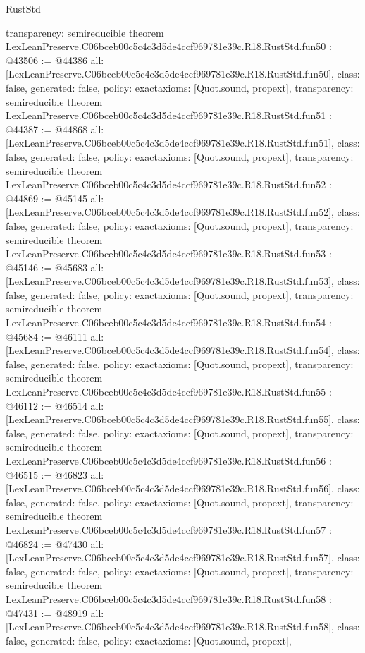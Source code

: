 \begin{lexlean}{RustStd}
\begin{coremodule}
{  transparency: semireducible
}
theorem LexLeanPreserve.C06bceb00c5c4c3d5de4ccf969781e39c.R18.RustStd.fun50 : @43506 := @44386 {
  all: [LexLeanPreserve.C06bceb00c5c4c3d5de4ccf969781e39c.R18.RustStd.fun50],
  class: false,
  generated: false,
  policy: exact{axioms: [Quot.sound, propext]},
  transparency: semireducible
}
theorem LexLeanPreserve.C06bceb00c5c4c3d5de4ccf969781e39c.R18.RustStd.fun51 : @44387 := @44868 {
  all: [LexLeanPreserve.C06bceb00c5c4c3d5de4ccf969781e39c.R18.RustStd.fun51],
  class: false,
  generated: false,
  policy: exact{axioms: [Quot.sound, propext]},
  transparency: semireducible
}
theorem LexLeanPreserve.C06bceb00c5c4c3d5de4ccf969781e39c.R18.RustStd.fun52 : @44869 := @45145 {
  all: [LexLeanPreserve.C06bceb00c5c4c3d5de4ccf969781e39c.R18.RustStd.fun52],
  class: false,
  generated: false,
  policy: exact{axioms: [Quot.sound, propext]},
  transparency: semireducible
}
theorem LexLeanPreserve.C06bceb00c5c4c3d5de4ccf969781e39c.R18.RustStd.fun53 : @45146 := @45683 {
  all: [LexLeanPreserve.C06bceb00c5c4c3d5de4ccf969781e39c.R18.RustStd.fun53],
  class: false,
  generated: false,
  policy: exact{axioms: [Quot.sound, propext]},
  transparency: semireducible
}
theorem LexLeanPreserve.C06bceb00c5c4c3d5de4ccf969781e39c.R18.RustStd.fun54 : @45684 := @46111 {
  all: [LexLeanPreserve.C06bceb00c5c4c3d5de4ccf969781e39c.R18.RustStd.fun54],
  class: false,
  generated: false,
  policy: exact{axioms: [Quot.sound, propext]},
  transparency: semireducible
}
theorem LexLeanPreserve.C06bceb00c5c4c3d5de4ccf969781e39c.R18.RustStd.fun55 : @46112 := @46514 {
  all: [LexLeanPreserve.C06bceb00c5c4c3d5de4ccf969781e39c.R18.RustStd.fun55],
  class: false,
  generated: false,
  policy: exact{axioms: [Quot.sound, propext]},
  transparency: semireducible
}
theorem LexLeanPreserve.C06bceb00c5c4c3d5de4ccf969781e39c.R18.RustStd.fun56 : @46515 := @46823 {
  all: [LexLeanPreserve.C06bceb00c5c4c3d5de4ccf969781e39c.R18.RustStd.fun56],
  class: false,
  generated: false,
  policy: exact{axioms: [Quot.sound, propext]},
  transparency: semireducible
}
theorem LexLeanPreserve.C06bceb00c5c4c3d5de4ccf969781e39c.R18.RustStd.fun57 : @46824 := @47430 {
  all: [LexLeanPreserve.C06bceb00c5c4c3d5de4ccf969781e39c.R18.RustStd.fun57],
  class: false,
  generated: false,
  policy: exact{axioms: [Quot.sound, propext]},
  transparency: semireducible
}
theorem LexLeanPreserve.C06bceb00c5c4c3d5de4ccf969781e39c.R18.RustStd.fun58 : @47431 := @48919 {
  all: [LexLeanPreserve.C06bceb00c5c4c3d5de4ccf969781e39c.R18.RustStd.fun58],
  class: false,
  generated: false,
  policy: exact{axioms: [Quot.sound, propext]},
}
\end{coremodule}
\end{lexlean}
